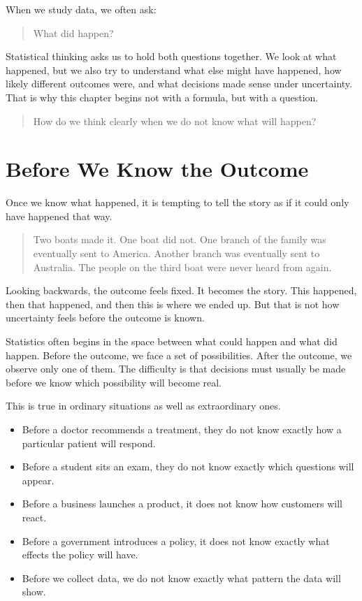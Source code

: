 \documentclass[
  letterpaper,
  DIV=11,
  numbers=noendperiod]{scrreprt}
\providecommand{\tightlist}{%
  \setlength{\itemsep}{0pt}\setlength{\parskip}{0pt}}
\begin{document}
When we study data, we often ask:

\begin{quote}
What did happen?
\end{quote}

Statistical thinking asks us to hold both questions together. We look at
what happened, but we also try to understand what else might have
happened, how likely different outcomes were, and what decisions made
sense under uncertainty. That is why this chapter begins not with a
formula, but with a question.

\begin{quote}
How do we think clearly when we do not know what will happen?
\end{quote}

\section{Before We Know the Outcome}\label{before-we-know-the-outcome}

Once we know what happened, it is tempting to tell the story as if it
could only have happened that way.

\begin{quote}
Two boats made it. One boat did not. One branch of the family was
eventually sent to America. Another branch was eventually sent to
Australia. The people on the third boat were never heard from again.
\end{quote}

Looking backwards, the outcome feels fixed. It becomes the story. This
happened, then that happened, and then this is where we ended up. But
that is not how uncertainty feels before the outcome is known.

Statistics often begins in the space between what could happen and what
did happen. Before the outcome, we face a set of possibilities. After
the outcome, we observe only one of them. The difficulty is that
decisions must usually be made before we know which possibility will
become real.

This is true in ordinary situations as well as extraordinary ones.

\begin{itemize}
\tightlist
\item
  Before a doctor recommends a treatment, they do not know exactly how a
  particular patient will respond.
\item
  Before a student sits an exam, they do not know exactly which
  questions will appear.
\item
  Before a business launches a product, it does not know how customers
  will react.
\item
  Before a government introduces a policy, it does not know exactly what
  effects the policy will have.
\item
  Before we collect data, we do not know exactly what pattern the data
  will show.
\end{itemize}
\end{document}
